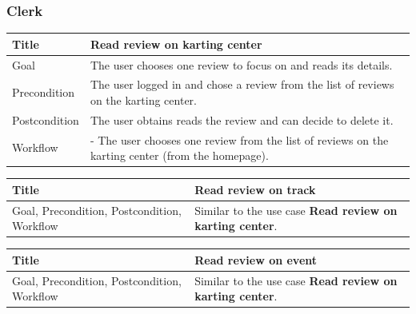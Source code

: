 \documentclass{beamer}
\begin{document}
\begin{frame}
\end{frame}

\begin{frame}
    \frametitle{Clerk}
    \begin{table}
        \tiny
        \begin{tabular}{|p{2cm}|p{6cm}|}
        \hline  
        Title & \textbf{Read review on karting center} \\
        \hline
        Goal & The user chooses one review to focus on and reads its details. \\
        \hline
        Precondition & The user logged in and chose a review from the list of reviews on the karting center. \\
        \hline
        Postcondition & The user obtains reads the review and can decide to delete it. \\
        \hline
        Workflow &
        - The user chooses one review from the list of reviews on the karting center (from the homepage). \\
        \hline
        \end{tabular}
    \end{table}

    \begin{table}
        \tiny
        \begin{tabular}{|p{2cm}|p{6cm}|}
        \hline  
        Title & \textbf{Read review on track} \\
        \hline
        Goal, Precondition, Postcondition, Workflow & Similar 
        to the use case \textbf{Read review on karting center}. \\
        \hline
        \end{tabular}
    \end{table}

    \begin{table}
        \tiny
        \begin{tabular}{|p{2cm}|p{6cm}|}
        \hline  
        Title & \textbf{Read review on event} \\
        \hline
        Goal, Precondition, Postcondition, Workflow & Similar 
        to the use case \textbf{Read review on karting center}. \\
        \hline
        \end{tabular}
    \end{table}

\end{frame}
\end{document}
